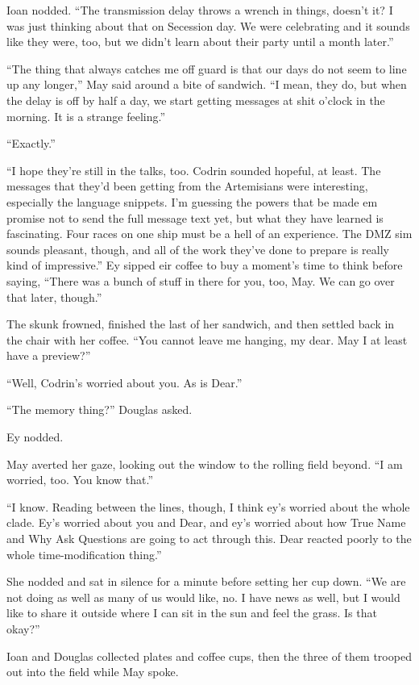 Ioan nodded. ``The transmission delay throws a wrench in things, doesn't it? I was just thinking about that on Secession day. We were celebrating and it sounds like they were, too, but we didn't learn about their party until a month later.''

``The thing that always catches me off guard is that our days do not seem to line up any longer,'' May said around a bite of sandwich. ``I mean, they do, but when the delay is off by half a day, we start getting messages at shit o'clock in the morning. It is a strange feeling.''

``Exactly.''

``I hope they're still in the talks, too. Codrin sounded hopeful, at least. The messages that they'd been getting from the Artemisians were interesting, especially the language snippets. I'm guessing the powers that be made em promise not to send the full message text yet, but what they have learned is fascinating. Four races on one ship must be a hell of an experience. The DMZ sim sounds pleasant, though, and all of the work they've done to prepare is really kind of impressive.'' Ey sipped eir coffee to buy a moment's time to think before saying, ``There was a bunch of stuff in there for you, too, May. We can go over that later, though.''

The skunk frowned, finished the last of her sandwich, and then settled back in the chair with her coffee. ``You cannot leave me hanging, my dear. May I at least have a preview?''

``Well, Codrin's worried about you. As is Dear.''

``The memory thing?'' Douglas asked.

Ey nodded.

May averted her gaze, looking out the window to the rolling field beyond. ``I am worried, too. You know that.''

``I know. Reading between the lines, though, I think ey's worried about the whole clade. Ey's worried about you and Dear, and ey's worried about how True Name and Why Ask Questions are going to act through this. Dear reacted poorly to the whole time-modification thing.''

She nodded and sat in silence for a minute before setting her cup down. ``We are not doing as well as many of us would like, no. I have news as well, but I would like to share it outside where I can sit in the sun and feel the grass. Is that okay?''

Ioan and Douglas collected plates and coffee cups, then the three of them trooped out into the field while May spoke.

